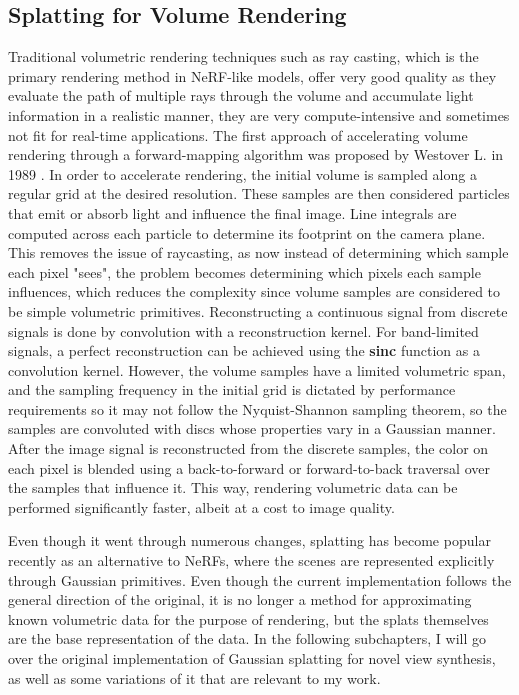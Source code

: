 \subsection{Splatting for Volume Rendering}
Traditional volumetric rendering techniques such as ray casting, which is the primary rendering method in NeRF-like models, offer very good quality as they evaluate the path of multiple rays through the volume and accumulate light information in a realistic manner, they are very compute-intensive and sometimes not fit for real-time applications. The first approach of accelerating volume rendering through a forward-mapping algorithm was proposed by Westover L. in 1989 \cite{westover89splatting}. In order to accelerate rendering, the initial volume is sampled along a regular grid at the desired resolution. These samples are then considered particles that emit or absorb light and influence the final image. Line integrals are computed across each particle to determine its footprint on the camera plane. This removes the issue of raycasting, as now instead of determining which sample each pixel "sees", the problem becomes determining which pixels each sample influences, which reduces the complexity since volume samples are considered to be simple volumetric primitives. Reconstructing a continuous signal from discrete signals is done by convolution with a reconstruction kernel. For band-limited signals, a perfect reconstruction can be achieved using the \textbf{sinc} function as a convolution kernel. However, the volume samples have a limited volumetric span, and the sampling frequency in the initial grid is dictated by performance requirements so it may not follow the Nyquist-Shannon sampling theorem, so the samples are convoluted with discs whose properties vary in a Gaussian manner. After the image signal is reconstructed from the discrete samples, the color on each pixel is blended using a back-to-forward or forward-to-back traversal over the samples that influence it. This way, rendering volumetric data can be performed significantly faster, albeit at a cost to image quality. 

Even though it went through numerous changes, splatting has become popular recently as an alternative to NeRFs, where the scenes are represented explicitly through Gaussian primitives. Even though the current implementation follows the general direction of the original, it is no longer a method for approximating known volumetric data for the purpose of rendering, but the splats themselves are the base representation of the data. In the following subchapters, I will go over the original implementation of Gaussian splatting for novel view synthesis, as well as some variations of it that are relevant to my work.

